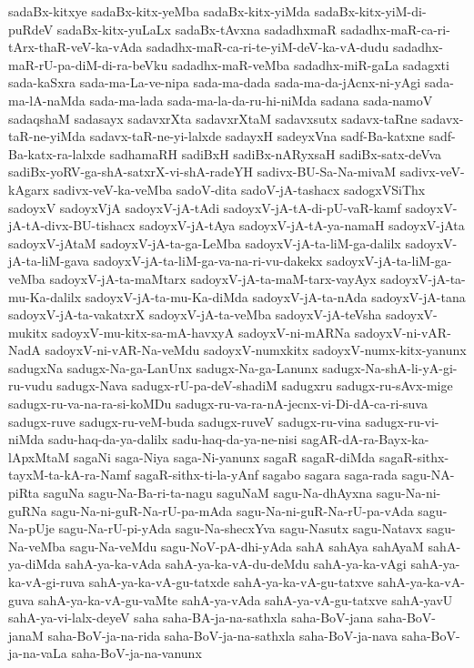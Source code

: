 {sadaBx-kitxye
sadaBx-kitx-yeMba
sadaBx-kitx-yiMda
sadaBx-kitx-yiM-di-puRdeV
sadaBx-kitx-yuLaLx
sadaBx-tAvxna
sadadhxmaR
sadadhx-maR-ca-ri-tArx-thaR-veV-ka-vAda
sadadhx-maR-ca-ri-te-yiM-deV-ka-vA-dudu
sadadhx-maR-rU-pa-diM-di-ra-beVku
sadadhx-maR-veMba
sadadhx-miR-gaLa
sadagxti
sada-kaSxra
sada-ma-La-ve-nipa
sada-ma-dada
sada-ma-da-jAcnx-ni-yAgi
sada-ma-lA-naMda
sada-ma-lada
sada-ma-la-da-ru-hi-niMda
sadana
sada-namoV
sadaqshaM
sadasayx
sadavxrXta
sadavxrXtaM
sadavxsutx
sadavx-taRne
sadavx-taR-ne-yiMda
sadavx-taR-ne-yi-lalxde
sadayxH
sadeyxVna
sadf-Ba-katxne
sadf-Ba-katx-ra-lalxde
sadhamaRH
sadiBxH
sadiBx-nARyxsaH
sadiBx-satx-deVva
sadiBx-yoRV-ga-shA-satxrX-vi-shA-radeYH
sadivx-BU-Sa-Na-mivaM
sadivx-veV-kAgarx
sadivx-veV-ka-veMba
sadoV-dita
sadoV-jA-tashacx
sadogxVSiThx
sadoyxV
sadoyxVjA
sadoyxV-jA-tAdi
sadoyxV-jA-tA-di-pU-vaR-kamf
sadoyxV-jA-tA-divx-BU-tishacx
sadoyxV-jA-tAya
sadoyxV-jA-tA-ya-namaH
sadoyxV-jAta
sadoyxV-jAtaM
sadoyxV-jA-ta-ga-LeMba
sadoyxV-jA-ta-liM-ga-dalilx
sadoyxV-jA-ta-liM-gava
sadoyxV-jA-ta-liM-ga-va-na-ri-vu-dakekx
sadoyxV-jA-ta-liM-ga-veMba
sadoyxV-jA-ta-maMtarx
sadoyxV-jA-ta-maM-tarx-vayAyx
sadoyxV-jA-ta-mu-Ka-dalilx
sadoyxV-jA-ta-mu-Ka-diMda
sadoyxV-jA-ta-nAda
sadoyxV-jA-tana
sadoyxV-jA-ta-vakatxrX
sadoyxV-jA-ta-veMba
sadoyxV-jA-teVsha
sadoyxV-mukitx
sadoyxV-mu-kitx-sa-mA-havxyA
sadoyxV-ni-mARNa
sadoyxV-ni-vAR-NadA
sadoyxV-ni-vAR-Na-veMdu
sadoyxV-numxkitx
sadoyxV-numx-kitx-yanunx
sadugxNa
sadugx-Na-ga-LanUnx
sadugx-Na-ga-Lanunx
sadugx-Na-shA-li-yA-gi-ru-vudu
sadugx-Nava
sadugx-rU-pa-deV-shadiM
sadugxru
sadugx-ru-sAvx-mige
sadugx-ru-va-na-ra-si-koMDu
sadugx-ru-va-ra-nA-jecnx-vi-Di-dA-ca-ri-suva
sadugx-ruve
sadugx-ru-veM-buda
sadugx-ruveV
sadugx-ru-vina
sadugx-ru-vi-niMda
sadu-haq-da-ya-dalilx
sadu-haq-da-ya-ne-nisi
sagAR-dA-ra-Bayx-ka-lApxMtaM
sagaNi
saga-Niya
saga-Ni-yanunx
sagaR
sagaR-diMda
sagaR-sithx-tayxM-ta-kA-ra-Namf
sagaR-sithx-ti-la-yAnf
sagabo
sagara
saga-rada
sagu-NA-piRta
saguNa
sagu-Na-Ba-ri-ta-nagu
saguNaM
sagu-Na-dhAyxna
sagu-Na-ni-guRNa
sagu-Na-ni-guR-Na-rU-pa-mAda
sagu-Na-ni-guR-Na-rU-pa-vAda
sagu-Na-pUje
sagu-Na-rU-pi-yAda
sagu-Na-shecxYva
sagu-Nasutx
sagu-Natavx
sagu-Na-veMba
sagu-Na-veMdu
sagu-NoV-pA-dhi-yAda
sahA
sahAya
sahAyaM
sahA-ya-diMda
sahA-ya-ka-vAda
sahA-ya-ka-vA-du-deMdu
sahA-ya-ka-vAgi
sahA-ya-ka-vA-gi-ruva
sahA-ya-ka-vA-gu-tatxde
sahA-ya-ka-vA-gu-tatxve
sahA-ya-ka-vA-guva
sahA-ya-ka-vA-gu-vaMte
sahA-ya-vAda
sahA-ya-vA-gu-tatxve
sahA-yavU
sahA-ya-vi-lalx-deyeV
saha
saha-BA-ja-na-sathxla
saha-BoV-jana
saha-BoV-janaM
saha-BoV-ja-na-rida
saha-BoV-ja-na-sathxla
saha-BoV-ja-nava
saha-BoV-ja-na-vaLa
saha-BoV-ja-na-vanunx
}
